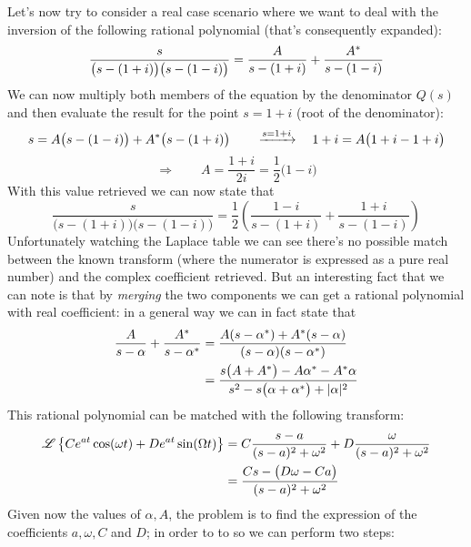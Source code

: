 	\vspace{3mm}
	Let's now try to consider a real case scenario where we want to deal with the inversion of the following rational polynomial (that's consequently expanded):
	\[ \frac s { \big( s - (1+i) \big)\big( s - (1-i) \big) } = \frac A {s - (1+i)} + \frac {A^*}{s-(1-i)}  \]
	We can now multiply both members of the equation by the denominator $Q(s)$ and then evaluate the result for the point $s  = 1+i$ (root of the denominator):
	\[ s = A \big(s-(1-i)\big) + A^*\big(s-(1+i)\big) \qquad \xrightarrow{s = 1+i} \quad 1+i = A \big(1+i - 1 + i\big)\]
	\[ \Rightarrow \qquad A = \frac{1+i}{2i} = \frac 1 2 \big(1 - i	\big) \]
	With this value retrieved we can now state that
	\[ \frac s { \big( s - (1+i) \big)\big( s - (1-i) \big) } = \frac 1 2 \left(\frac {1-i} {s - (1+i)} + \frac {1+i}{s-(1-i)} \right)  \]
	Unfortunately watching the Laplace table we can see there's no possible match between the known transform (where the numerator is expressed as a pure real number) and the complex coefficient retrieved. But an interesting fact that we can note is that by \textit{merging} the two components we can get a rational polynomial with real coefficient: in a general way we can in fact state that
	\begin{align*}
		\frac A {s-\alpha} + \frac{A^*}{s-\alpha^*} & = \frac{A(s-\alpha^*) + A^*(s-\alpha)}{(s-\alpha)(s-\alpha^*)} \\
		& = \frac{ s\big(A+A^*\big) - A\alpha^* - A^*\alpha }{s^2 - s \big(\alpha+\alpha^*\big) + |\alpha|^2}
	\end{align*}
	This rational polynomial can be matched with the following transform:
	\begin{align*}
		\mathscr{L} \left\{ Ce^{at}\cos(\omega t) + D e^{at}\sin(\Omega t) \right\} & =C \frac{s-a}{(s-a)^2+\omega^2} + D \frac{\omega}{(s-a)^2 + \omega^2} \\
		& = \frac{Cs - \big(D\omega - Ca\big)}{(s-a)^2 + \omega^2 }
	\end{align*}
	Given now the values of $\alpha,A$, the problem is to find the expression of the coefficients $a,\omega,C$ and $D$; in order to to so we can perform two steps:
